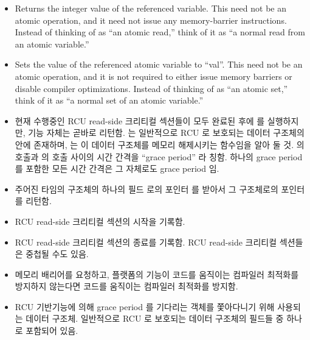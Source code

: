 \begin{itemize}
\item	{}
	Returns the integer value of the referenced variable.
	This need not be an atomic operation, and it need not issue any
	memory-barrier instructions.
	Instead of thinking of as ``an atomic read,'' think of it as
	``a normal read from an atomic variable.''
\item	{}
	Sets the value of the referenced atomic variable to ``val''.
	This need not be an atomic operation, and it is not required
	to either issue memory
	barriers or disable compiler optimizations.
	Instead of thinking of as ``an atomic set,'' think of it as
	``a normal set of an atomic variable.''
\fi
\item	{}
	현재 수행중인 RCU read-side 크리티컬 섹션들이 모두 완료된 후에
	 를 실행하지만,  기능 자체는 곧바로
	리턴함.
	 는 일반적으로 RCU 로 보호되는 데이터 구조체의 안에 존재하며,
	 는 이 데이터 구조체를 메모리 해제시키는 함수임을 알아 둘 것.
	 의 호출과  의 호출 사이의 시간 간격을
	``grace period'' 라 칭함.
	하나의 grace period 를 포함한 모든 시간 간격은 그 자체로도 grace period
	임.
\item	{}
	주어진 타임의 구조체의 하나의 필드  로의 포인터 를 받아서
	그 구조체로의 포인터를 리턴함.

\item	{}
	RCU read-side 크리티컬 섹션의 시작을 기록함.
\item	{}
	RCU read-side 크리티컬 섹션의 종료를 기록함.
	RCU read-side 크리티컬 섹션들은 중첩될 수도 있음.
\item	{}
	메모리 배리어를 요청하고, 플랫폼의  기능이 코드를
	움직이는 컴파일러 최적화를 방지하지 않는다면 코드를 움직이는 컴파일러
	최적화를 방지함.
\item	{}
	RCU 기반기능에 의해 grace period 를 기다리는 객체를 쫓아다니기 위해
	사용되는 데이터 구조체.
	일반적으로 RCU 로 보호되는 데이터 구조체의 필드들 중 하나로 포함되어
	있음.
\iffalse


\end{itemize}
